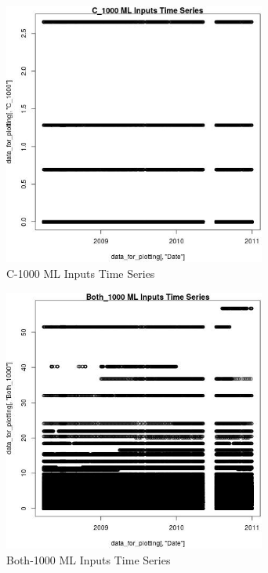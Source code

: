 \begin{figure} 
\centering  
\includegraphics[width=0.77\textwidth]{Code_Outputs/ML_input_report_ML_input_PM25_Step5_part_d_de_duplicated_aves_ML_input_C_1000vDate.jpg} 
\caption{\label{fig:ML_input_report_ML_input_PM25_Step5_part_d_de_duplicated_aves_ML_inputC_1000vDate}C-1000 ML Inputs Time Series} 
\end{figure} 
 

\begin{figure} 
\centering  
\includegraphics[width=0.77\textwidth]{Code_Outputs/ML_input_report_ML_input_PM25_Step5_part_d_de_duplicated_aves_ML_input_Both_1000vDate.jpg} 
\caption{\label{fig:ML_input_report_ML_input_PM25_Step5_part_d_de_duplicated_aves_ML_inputBoth_1000vDate}Both-1000 ML Inputs Time Series} 
\end{figure} 
 

